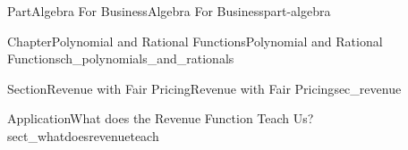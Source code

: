 \documentclass{tufte-book}
\numberwithin{equation}{chapter}
\begin{document}
\begin{partptx}{Part}{Algebra For Business}{}{Algebra For Business}{}{}{part-algebra}
\begin{chapterptx}{Chapter}{Polynomial and Rational Functions}{}{Polynomial and Rational Functions}{}{}{ch_polynomials_and_rationals}
\begin{sectionptx}{Section}{Revenue with Fair Pricing}{}{Revenue with Fair Pricing}{}{}{sec_revenue}
\begin{insight}{Application}{What does the Revenue Function Teach Us?}{sect_whatdoesrevenueteach}
\begin{image}{0}{1}{0}{}
{\begin{tikzpicture}[xscale=\xscale,yscale=\yscale]
	
\end{tikzpicture}
%
\quad
%
}
\end{image}
\end{insight}
\end{sectionptx}
\end{chapterptx}
\end{partptx}
\end{document}
